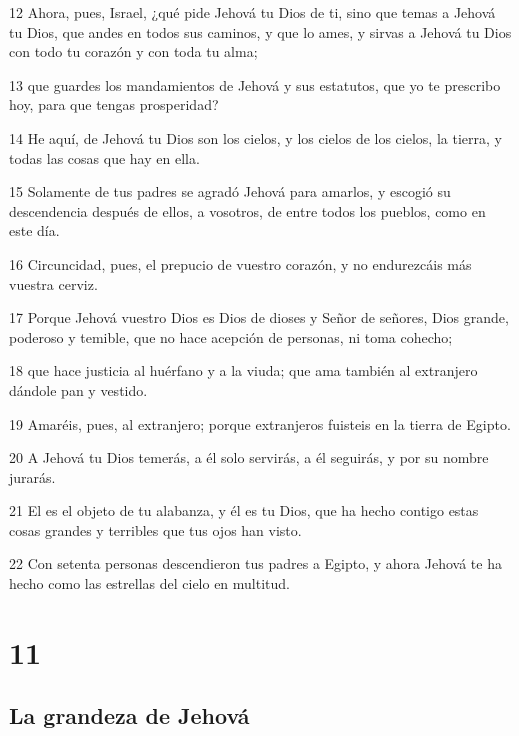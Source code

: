\par 12 Ahora, pues, Israel, ¿qué pide Jehová tu Dios de ti, sino que temas a Jehová tu Dios, que andes en todos sus caminos, y que lo ames, y sirvas a Jehová tu Dios con todo tu corazón y con toda tu alma;
\par 13 que guardes los mandamientos de Jehová y sus estatutos, que yo te prescribo hoy, para que tengas prosperidad?
\par 14 He aquí, de Jehová tu Dios son los cielos, y los cielos de los cielos, la tierra, y todas las cosas que hay en ella.
\par 15 Solamente de tus padres se agradó Jehová para amarlos, y escogió su descendencia después de ellos, a vosotros, de entre todos los pueblos, como en este día.
\par 16 Circuncidad, pues, el prepucio de vuestro corazón, y no endurezcáis más vuestra cerviz.
\par 17 Porque Jehová vuestro Dios es Dios de dioses y Señor de señores, Dios grande, poderoso y temible, que no hace acepción de personas, ni toma cohecho;
\par 18 que hace justicia al huérfano y a la viuda; que ama también al extranjero dándole pan y vestido.
\par 19 Amaréis, pues, al extranjero; porque extranjeros fuisteis en la tierra de Egipto.
\par 20 A Jehová tu Dios temerás, a él solo servirás, a él seguirás, y por su nombre jurarás.
\par 21 El es el objeto de tu alabanza, y él es tu Dios, que ha hecho contigo estas cosas grandes y terribles que tus ojos han visto.
\par 22 Con setenta personas descendieron tus padres a Egipto, y ahora Jehová te ha hecho como las estrellas del cielo en multitud.

\chapter{11}

\section{La grandeza de Jehová}

